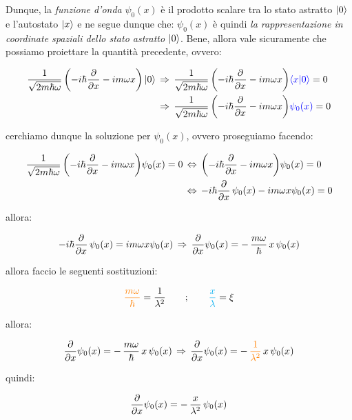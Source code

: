 	Dunque, la \textit{funzione d'onda} $\psi_0(x)$ è il prodotto scalare tra lo stato astratto $\ket{0}$ e l'autostato $\ket{x}$ e ne segue dunque che: $\psi_0(x)$ è quindi \textit{la rappresentazione in coordinate spaziali dello stato astratto $\ket{0}$}. Bene, allora vale sicuramente che possiamo proiettare la quantità precedente, ovvero:

\begin{align*}
	 \frac{1}{\sqrt{2m\hbar \omega}} \, \qty( - i \hbar \pdv{x} - im\omega x) \ket{0} \, &\Rightarrow \, \frac{1}{\sqrt{2m\hbar \omega}} \, \qty( - i \hbar \pdv{x} - im\omega x) \textcolor{blue}{\braket{x}{0}} = 0 \\
	 & \Rightarrow \, \frac{1}{\sqrt{2m\hbar \omega}} \, \qty( - i \hbar \pdv{x} - im\omega x) \textcolor{blue}{\psi_0(x)} = 0
\end{align*}

	cerchiamo dunque la soluzione per $\psi_0(x)$, ovvero proseguiamo facendo:
	
\begin{align*}
	\frac{1}{\sqrt{2m\hbar \omega}} \, \qty( - i \hbar \pdv{x} - im\omega x) \psi_0(x) = 0 \, &\Leftrightarrow \,  \qty( - i \hbar \pdv{x} - im\omega x) \psi_0(x) = 0 \\
	& \Leftrightarrow \,  - i \hbar \pdv{x} \, \psi_0(x) - im\omega x  \psi_0(x) = 0 
\end{align*}

	allora:
	
\begin{align*}
	- i \hbar \pdv{x} \, \psi_0(x) = im\omega x  \psi_0(x) \, \Rightarrow \, \pdv{x}  \psi_0(x) = - \, \frac{m\omega }{\hbar} \, x \, \psi_0(x)
\end{align*}

	allora faccio le seguenti sostituzioni:
	
\begin{align*}
	\textcolor{orange}{\frac{m\omega}{\hbar}} = \frac{1}{\lambda^2} \qquad ; \qquad \textcolor{cyan}{\frac{x}{\lambda}} = \xi
\end{align*}

	allora:
	
\begin{align*}
	\pdv{x} \psi_0(x) = - \, \frac{m\omega }{\hbar} \, x \, \psi_0(x) \, \Rightarrow \, \pdv{x} \psi_0(x) = - \, \textcolor{orange}{\frac{1}{\lambda^2}} \, x \, \psi_0(x)
\end{align*}

	quindi:

\begin{align*}
	\pdv{x} \psi_0(x) = - \, \frac{x}{\lambda^2}  \, \psi_0(x)
\end{align*}

